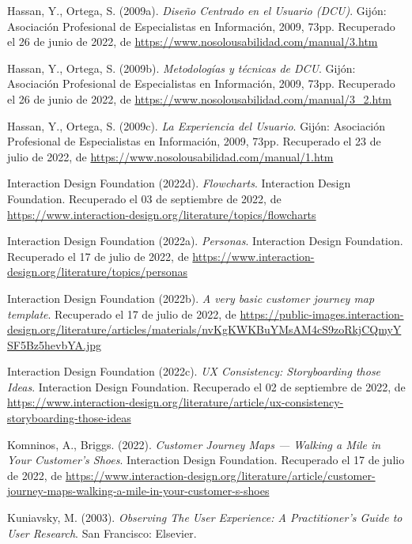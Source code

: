 \begin{thebibliography}{9}
Hassan, Y., Ortega, S. (2009a). \emph{Diseño Centrado en el Usuario (DCU)}. Gijón: Asociación Profesional de Especialistas en Información, 2009, 73pp. Recuperado el 26 de junio de 2022, de \url{https://www.nosolousabilidad.com/manual/3.htm}

Hassan, Y., Ortega, S. (2009b). \emph{Metodologías y técnicas de DCU}. Gijón: Asociación Profesional de Especialistas en Información, 2009, 73pp. Recuperado el 26 de junio de 2022, de \url{https://www.nosolousabilidad.com/manual/3_2.htm}

Hassan, Y., Ortega, S. (2009c). \emph{La Experiencia del Usuario}. Gijón: Asociación Profesional de Especialistas en Información, 2009, 73pp. Recuperado el 23 de julio de 2022, de \url{https://www.nosolousabilidad.com/manual/1.htm}

Interaction Design Foundation (2022d). \emph{Flowcharts}. Interaction Design Foundation. Recuperado el 03 de septiembre de 2022, de \url{https://www.interaction-design.org/literature/topics/flowcharts}

Interaction Design Foundation (2022a). \emph{Personas}. Interaction Design Foundation. Recuperado el 17 de julio de 2022, de \url{https://www.interaction-design.org/literature/topics/personas}

Interaction Design Foundation (2022b). \emph{A very basic customer journey map template}. Recuperado el 17 de julio de 2022, de \url{https://public-images.interaction-design.org/literature/articles/materials/nvKgKWKBuYMsAM4cS9zoRkjCQmyYSF5Bz5hevbYA.jpg}

Interaction Design Foundation (2022c). \emph{UX Consistency: Storyboarding those Ideas}. Interaction Design Foundation. Recuperado el 02 de septiembre de 2022, de \url{https://www.interaction-design.org/literature/article/ux-consistency-storyboarding-those-ideas}

Komninos, A., Briggs. (2022). \emph{Customer Journey Maps — Walking a Mile in Your Customer's Shoes}. Interaction Design Foundation. Recuperado el 17 de julio de 2022, de \url{https://www.interaction-design.org/literature/article/customer-journey-maps-walking-a-mile-in-your-customer-s-shoes}

Kuniavsky, M. (2003). \emph{Observing The User Experience: A Practitioner's Guide to User Research}. San Francisco: Elsevier.


\end{thebibliography}
